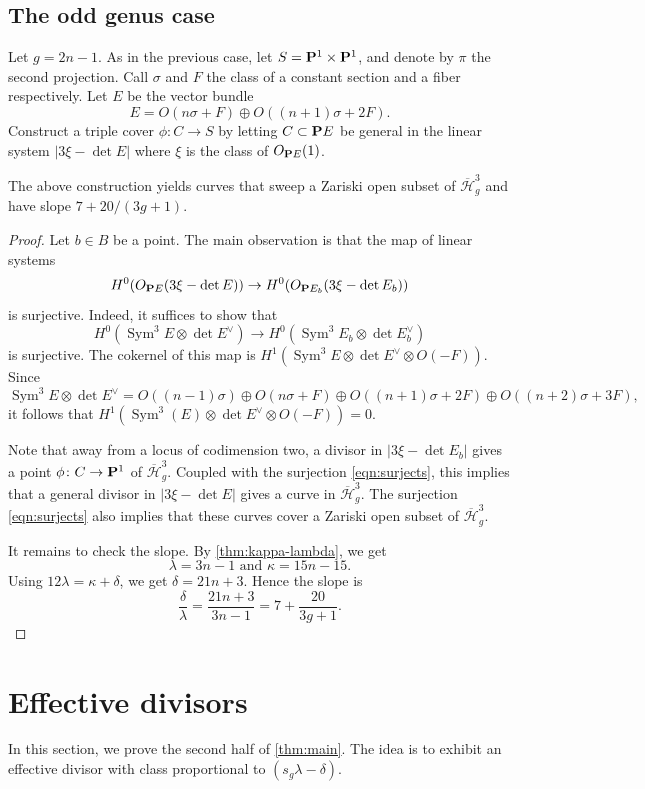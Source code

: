 \documentclass{amsart}
\renewcommand {\P}{{\bf P}}
\newcommand {\from}{{\colon}}
\newcommand{\orb}[1]{{\mathcal #1}}     %
\renewcommand {\o}[1]{\overline{#1}}
\newcommand{\dual}[1]{#1^{\vee}}
\DeclareMathOperator{\Sym}{Sym}
\renewcommand{\o}{\overline}
\begin{document}
\subsection{The odd genus case}\label{sec:odd_curve}
Let $g = 2n-1$. As in the previous case, let $S = \P^1\times\P^1$, and denote by $\pi$ the second projection. Call $\sigma$ and $F$ the class of a constant section and a fiber respectively. Let $E$ be the vector bundle
\[ E = O(n \sigma + F) \oplus O((n+1)\sigma + 2F).\]
Construct a triple cover $\phi \from C \to S$ by letting $C \subset \P E$ be general in the linear system $|3 \xi - \det E|$ where $\xi$ is the class of $O_{\P E}(1)$. 
\begin{proposition}\label{thm:odd_sweeping}
  The above construction yields curves that sweep a Zariski open subset of $\o{\orb H}^3_g$ and have slope $7 + 20/(3g+1)$.
\end{proposition}
\begin{proof}
  Let $b \in B$ be a point. The main observation is that the map of linear systems
  \begin{equation}\label{eqn:surjects}
    H^0(O_{\P E}(3\xi - \det E)) \to H^0(O_{\P E_b}(3\xi - \det     E_b))
\end{equation}
is surjective. Indeed, it suffices to show that
\[ H^0(\Sym^3 E \otimes \det \dual E) \to H^0(\Sym^3 E_b \otimes \det \dual E_b)\]
is surjective. The cokernel of this map is $H^1(\Sym^3E \otimes \det\dual E \otimes O(-F))$. Since 
\[\Sym^3 E \otimes \det \dual E = O((n-1)\sigma) \oplus O(n\sigma+F) \oplus O((n+1)\sigma + 2F) \oplus O((n+2)\sigma+3F),\]
it follows that $H^1(\Sym^3(E) \otimes \det \dual E \otimes O(-F)) = 0$.

Note that away from a locus of codimension two, a divisor in $|3\xi - \det E_b|$ gives a point $\phi \from C \to \P^1$ of $\o{\orb H}^3_g$. Coupled with the surjection \eqref{eqn:surjects}, this implies that a general divisor in $|3\xi - \det E|$ gives a curve in $\o{\orb H}^3_g$. The surjection \eqref{eqn:surjects} also implies that these curves cover a Zariski open subset of $\o{\orb H}^3_g$. 

It remains to check the slope. By \autoref{thm:kappa-lambda}, we get
\[ \lambda = 3n - 1 \text{ and } \kappa = 15n-15.\]
Using $12 \lambda = \kappa + \delta$, we get $\delta = 21n+3$. Hence the slope is 
\[\frac{\delta}{\lambda} =  \frac{21n+3}{3n-1} = 7 + \frac{20}{3g+1}.\]
\end{proof}

\section{Effective divisors}\label{sec:divisor}
In this section, we prove the second half of \autoref{thm:main}. The idea is to exhibit an effective divisor with class proportional to $(s_g \lambda - \delta)$.
\end{document}
